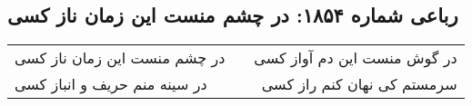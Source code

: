 \begin{center}
\section*{رباعی شماره ۱۸۵۴: در چشم منست این زمان ناز کسی}
\label{sec:1854}
\begin{longtable}{l p{0.5cm} r}
در چشم منست این زمان ناز کسی
&&
در گوش منست این دم آواز کسی
\\
در سینه منم حریف و انباز کسی
&&
سرمستم کی نهان کنم راز کسی
\\
\end{longtable}
\end{center}
